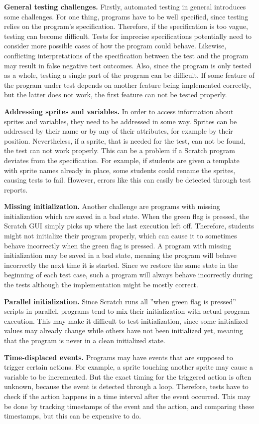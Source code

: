 \textbf{General testing challenges.}
Firstly, automated testing in general introduces some challenges.
For one thing, programs have to be well specified, since testing relies on the program's specification.
Therefore, if the specification is too vague, testing can become difficult.
Tests for imprecise specifications potentially need to consider more possible cases of how the program could behave.
Likewise, conflicting interpretations of the specification between the test and the program may result in false negative test outcomes.
Also, since the program is only tested as a whole, testing a single part of the program can be difficult.
If some feature of the program under test depends on another feature being implemented correctly,
but the latter does not work, the first feature can not be tested properly.
\parspace

\textbf{Addressing sprites and variables.}
In order to access information about sprites and variables, they need to be addressed in some way.
Sprites can be addressed by their name or by any of their attributes, for example by their position.
Nevertheless, if a sprite, that is needed for the test, can not be found, the test can not work properly.
This can be a problem if a Scratch program deviates from the specification.
For example, if students are given a template with sprite names already in place,
some students could rename the sprites, causing tests to fail.
However, errors like this can easily be detected through test reports.
\parspace

\textbf{Missing initialization.}
Another challenge are programs with missing initialization which are saved in a bad state.
When the green flag is pressed, the Scratch GUI simply picks up where the last execution left off.
Therefore, students might not initialize their program properly,
which can cause it to sometimes behave incorrectly when the green flag is pressed.
A program with missing initialization may be saved in a bad state,
meaning the program will behave incorrectly the next time it is started.
Since we restore the same state in the beginning of each test case,
such a program will always behave incorrectly during the tests although the implementation might be mostly correct.
\parspace

\textbf{Parallel initialization.}
Since Scratch runs all ''when green flag is pressed'' scripts in parallel,
programs tend to mix their initialization with actual program execution.
This may make it difficult to test initialization,
since some initialized values may already change while others have not been initialized yet,
meaning that the program is never in a clean initialized state.
\parspace

\textbf{Time-displaced events.}
Programs may have events that are supposed to trigger certain actions.
For example, a sprite touching another sprite may cause a variable to be incremented.
But the exact timing for the triggered action is often unknown, because the event is detected through a loop.
Therefore, tests have to check if the action happens in a time interval after the event occurred.
This may be done by tracking timestamps of the event and the action, and comparing these timestamps,
but this can be expensive to do.

